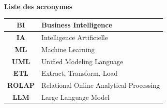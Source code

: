 \begin{center}
    
    {\Huge \bfseries Liste des acronymes} 
   
\end{center}
\vspace{1.5cm}

\begin{center}
\Large
\begin{tabular}{|c|l|}
\hline
\textbf{BI} & Business Intelligence \\
\hline
\textbf{IA} & Intelligence Artificielle \\
\hline
\textbf{ML} & Machine Learning \\
\hline
\textbf{UML} & Unified Modeling Language \\
\hline
\textbf{ETL} & Extract, Transform, Load \\
\hline
\textbf{ROLAP} & Relational Online Analytical Processing\\
\hline
\textbf{LLM} & Large Language Model \\
\hline
\end{tabular}
\end{center}